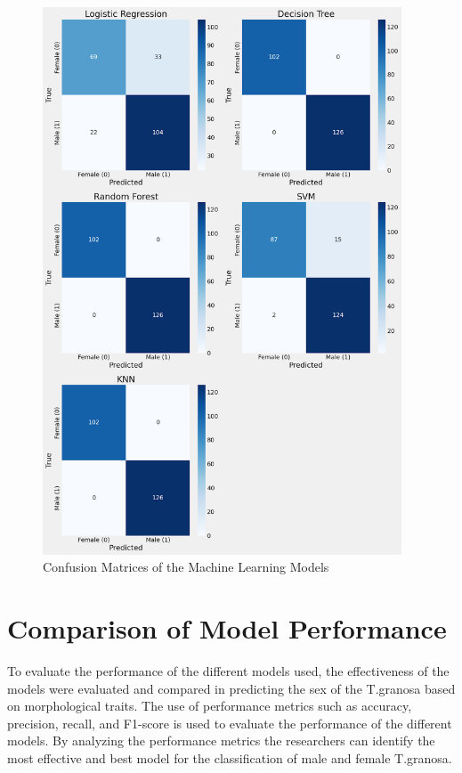 \begin{figure}[!htbp]
	\centering
	\includegraphics[width=0.95\textwidth]{figures/confusion matrices.png}
	\caption{Confusion Matrices of the Machine Learning Models}
	\label{fig:confusion matrices}
\end{figure}

\section{Comparison of Model Performance}

To evaluate the performance of the different models used, the effectiveness of the models were evaluated and compared in predicting the sex of the T.granosa based on morphological traits. The use of performance metrics such as accuracy, precision, recall, and F1-score is used to evaluate the performance of the different models. By analyzing the performance metrics the researchers can identify the most effective and best model for the classification of male and female T.granosa. 


